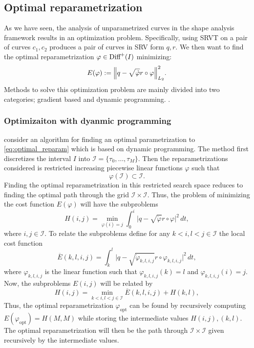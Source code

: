 
\subsection{Optimal reparametrization}
As we have seen, the analysis of unparametrized curves in the shape analysis framework results in an optimization problem. Specifically, using SRVT on a pair of curves \(c_1, c_2\) produces a pair of curves in SRV form \(q, r\). We then want to find the optimal reparametrization \(\varphi \in \text{Diff}^+(I)\) minimizing: 
\begin{equation}\label{eq:optimal_reparam}
  E(\varphi):=\norm{q- \sqrt{\dot\varphi}r \circ \varphi}_{L_2}^2.
\end{equation}
Methods to solve this optimization problem are mainly divided into two categories; gradient based and dynamic programming. .

\subsubsection{Optimizaiton with dyanmic programming}
\citeauthor{bauer2017dp} \cite{bauer2017dp} consider an algorithm for finding an optimal parametrization to \eqref{eq:optimal_reparam} which is based on dynamic programming. The method first discretizes the interval \(I\) into  \(\mathcal{I} = \{\tau_0, \ldots, \tau_M\}\). Then the reparametrizations considered is restricted increasing piecewise linear functions \(\varphi\) such that
\begin{equation*}
 \varphi(\mathcal{I}) \subset \mathcal{I}. 
\end{equation*}
Finding the optimal reparametrization in this restricted search space reduces to finding the optimal path through the grid \(\mathcal{I}\times\mathcal{I}\). Thus, the problem of minimizing the cost function \(E(\varphi)\) will have the subproblems 
\begin{equation}
  H(i, j) = \min_{\varphi(i) = j} \int_0^i \vert q- \sqrt{\dot\varphi }r \circ \varphi \vert^2 \, dt,
\end{equation}
where \(i,j \in \mathcal{I}\). To relate the subproblems define for any \(k <i, l<j \in \mathcal{I} \) the local cost function 
\begin{equation}
  \overline E(k,l,i,j) =   \int_k^l \vert q- \sqrt{\dot\varphi_{k,l,i,j} }r \circ \varphi_{k,l,i,j} \vert^2 \, dt ,
\end{equation}
where \(\varphi_{k,l,i,j} \) is the linear function such that \(\varphi_{k,l,i,j}(k)=l\) and \(\varphi_{k,l,i,j}(i)=j\). Now, the subproblems \(E(i,j)\) will be related by 
\begin{equation}
  H(i,j)  = \min_{k<i,l<j\in \mathcal{I}}\overline{E}(k,l,i,j) + H(k,l), 
\end{equation}
Thus, the optimal reparametrization \(\varphi_\text{opt}\) can be found by recursively computing \(E(\varphi_\text{opt})= H(M,M)\) while storing the intermediate values \(H(i,j), (k,l)\). The optimal reparametrization will then be the path through \(\mathcal{I}\times\mathcal{I}\) given recursively by the intermediate values. 

